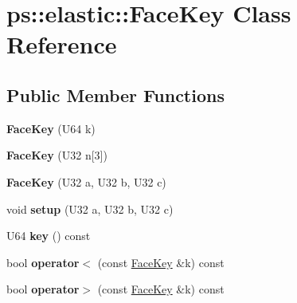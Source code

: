 \hypertarget{classps_1_1elastic_1_1FaceKey}{}\section{ps\+:\+:elastic\+:\+:Face\+Key Class Reference}
\label{classps_1_1elastic_1_1FaceKey}
\subsection*{Public Member Functions}
\begin{DoxyCompactItemize}
\item 
\hypertarget{classps_1_1elastic_1_1FaceKey_ace3aa2053e2a5eeb34662aa433a42264}{}{\bfseries Face\+Key} (U64 k)\label{classps_1_1elastic_1_1FaceKey_ace3aa2053e2a5eeb34662aa433a42264}

\item 
\hypertarget{classps_1_1elastic_1_1FaceKey_a54a822512bec6e757735a29c952b79d5}{}{\bfseries Face\+Key} (U32 n\mbox{[}3\mbox{]})\label{classps_1_1elastic_1_1FaceKey_a54a822512bec6e757735a29c952b79d5}

\item 
\hypertarget{classps_1_1elastic_1_1FaceKey_a8b95c8ed7397e06eae99622d729f1477}{}{\bfseries Face\+Key} (U32 a, U32 b, U32 c)\label{classps_1_1elastic_1_1FaceKey_a8b95c8ed7397e06eae99622d729f1477}

\item 
\hypertarget{classps_1_1elastic_1_1FaceKey_a8a5fb5f93b61dde73df4882038414231}{}void {\bfseries setup} (U32 a, U32 b, U32 c)\label{classps_1_1elastic_1_1FaceKey_a8a5fb5f93b61dde73df4882038414231}

\item 
\hypertarget{classps_1_1elastic_1_1FaceKey_a0a00022b1e4350d4df32958fc5bad542}{}U64 {\bfseries key} () const \label{classps_1_1elastic_1_1FaceKey_a0a00022b1e4350d4df32958fc5bad542}

\item 
\hypertarget{classps_1_1elastic_1_1FaceKey_a42eb90d0d1f020e3115eb992b0b44567}{}bool {\bfseries operator$<$} (const \hyperlink{classps_1_1elastic_1_1FaceKey}{Face\+Key} \&k) const \label{classps_1_1elastic_1_1FaceKey_a42eb90d0d1f020e3115eb992b0b44567}

\item 
\hypertarget{classps_1_1elastic_1_1FaceKey_a4b019b2d8607d2ae233cd99cbb5d3209}{}bool {\bfseries operator$>$} (const \hyperlink{classps_1_1elastic_1_1FaceKey}{Face\+Key} \&k) const \label{classps_1_1elastic_1_1FaceKey_a4b019b2d8607d2ae233cd99cbb5d3209}


\end{DoxyCompactItemize}
